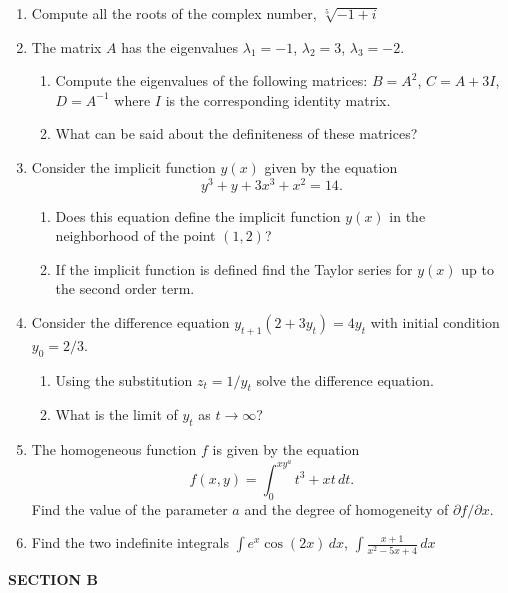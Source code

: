 \documentclass[12pt]{article} %
\theoremstyle{definition} %
\begin{document}
\begin{enumerate}

\item Compute all the roots of the complex number, $\sqrt[5]{-1+i}$

\item The matrix $A$ has the eigenvalues $\lambda_1=-1$, $\lambda_2=3$, $\lambda_3=-2$.
\begin{enumerate}
\item Compute the eigenvalues of the following matrices: $B=A^2$, $C=A+3I$, $D=A^{-1}$ where $I$ is the corresponding identity matrix.
\item What can be said about the definiteness of these matrices?
\end{enumerate}

\item Consider the implicit function $y(x)$ given by the equation
\[
y^3+y+3x^3+x^2=14.
\]
\begin{enumerate}
\item Does this equation define the implicit function $y(x)$ in the neighborhood of the point $(1,2)$?
\item If the implicit function is defined find the Taylor series for $y(x)$ up to the second order term.
\end{enumerate}


\item Consider the difference equation $y_{t+1}(2+3y_t)=4y_t$ with initial condition $y_0=2/3$.
\begin{enumerate}
\item Using the substitution $z_t=1/y_t$ solve the difference equation.
\item What is the limit of $y_t$ as $t\to\infty$?
\end{enumerate}

\item The homogeneous function $f$ is given by the equation
\[
f(x,y)=\int_0^{xy^a} t^3+xt \, dt.
\]
Find the value of the parameter $a$ and the degree of homogeneity of $\partial f/\partial x$.

\item Find the two indefinite integrals $\int e^x \cos(2x)\,dx$, $\int \frac{x+1}{x^2-5x+4}\, dx$

\end{enumerate}

\vspace{20pt}
\textbf{SECTION B}
\vspace{20pt}
\end{document}
